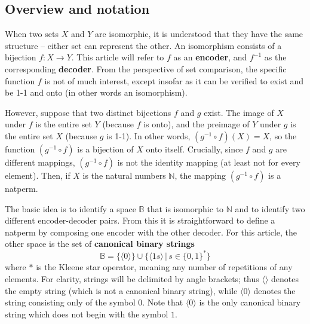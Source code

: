 \documentclass[12pt,reqno]{article}
\begin{document}
\subsection{Overview and notation}

When two sets $X$ and $Y$ are isomorphic, it is understood that they have the same structure -- either set can represent the other. An isomorphism consists of a bijection $f : X \rightarrow Y$. This article will refer to $f$ as an \textbf{encoder}, and $f^{-1}$ as the corresponding \textbf{decoder}. From the perspective of set comparison, the specific function $f$ is not of much interest, except insofar as it can be verified to exist and be 1-1 and onto (in other words an isomorphism).

However, suppose that two distinct bijections $f$ and $g$ exist. The image of $X$ under $f$ is the entire set $Y$ (because $f$ is onto), and the preimage of $Y$ under $g$ is the entire set $X$ (because $g$ is 1-1). In other words, $(g^{-1} \circ f) (X) = X$, so the function $(g^{-1} \circ f)$ is a bijection of $X$ onto itself. Crucially, since $f$ and $g$ are different mappings, $(g^{-1} \circ f)$ is not the identity mapping (at least not for every element). Then, if $X$ is the natural numbers $\mathbb{N}$, the mapping $(g^{-1} \circ f)$ is a natperm.

The basic idea is to identify a space $\mathbb{B}$ that is isomorphic to $\mathbb{N}$ and to identify two different encoder-decoder pairs. From this it is straightforward to define a natperm by composing one encoder with the other decoder. For this article, the other space is the set of \textbf{canonical binary strings}
\begin{equation}
  \mathbb{B} = \{ \langle 0 \rangle \} \cup \{ \langle 1s \rangle \, | \, s \in \{0,1\}^{*} \}
\end{equation}
where $*$ is the Kleene star operator, meaning any number of repetitions of any elements. For clarity, strings will be delimited by angle brackets; thus $\langle \rangle$ denotes the empty string (which is not a canonical binary string), while $\langle 0 \rangle$ denotes the string consisting only of the symbol $0$. Note that $\langle 0 \rangle$ is the only canonical binary string which does not begin with the symbol $1$.
\end{document}
